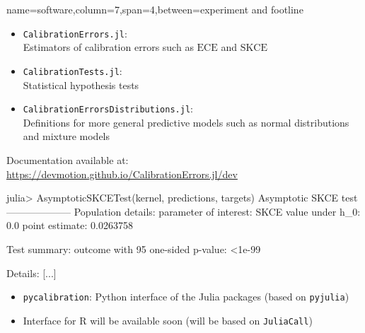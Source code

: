 \documentclass[10pt]{article}
\newcommand*{\ECE}{\text{ECE}}
\newcommand*{\squaredkernelmeasure}{\text{SKCE}}
\begin{document}
\begin{tcbposter}
\begin{posterboxenv}[adjusted title={Software packages}]{name=software,column=7,span=4,between=experiment and footline}{}

    \begin{tcbraster}[blankest, raster columns=2, raster equal height=rows, raster force size=false, raster column skip=5mm]
      \begin{tcolorbox}[add to width=-3mm]
        \begin{itemize}
        \item \texttt{CalibrationErrors.jl}:\\
          Estimators of calibration errors such as $\ECE$ and $\squaredkernelmeasure$
        \item \texttt{CalibrationTests.jl}:\\
          Statistical hypothesis tests
        \item \texttt{CalibrationErrorsDistributions.jl}:\\
          Definitions for more general predictive models
          such as normal distributions and mixture models
        \end{itemize}
        \begin{minipage}[t]{\linewidth-3\baselineskip}
          Documentation available at:\\
          \url{https://devmotion.github.io/CalibrationErrors.jl/dev}
        \end{minipage}%
        \hfill%
      \end{tcolorbox}
      \begin{juliaconsnippet}[add to width=3mm]
julia> AsymptoticSKCETest(kernel, predictions, targets)
Asymptotic SKCE test
--------------------
Population details:
    parameter of interest:   SKCE
    value under h_0:         0.0
    point estimate:          0.0263758

Test summary:
    outcome with 95%
    one-sided p-value:           <1e-99

Details:
[...]
      \end{juliaconsnippet}
    \end{tcbraster}


    \begin{itemize}
    \item \texttt{pycalibration}: Python interface of the Julia packages (based on \texttt{pyjulia})
    \item Interface for R will be available soon (will be based on \texttt{JuliaCall})
    \end{itemize}
  \end{posterboxenv}
\end{tcbposter}
\end{document}
